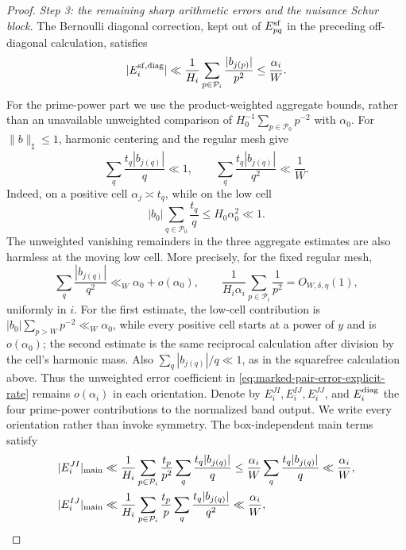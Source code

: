 \documentclass[11pt]{article}
\numberwithin{equation}{section}
\theoremstyle{definition}
\theoremstyle{remark}
\newcommand{\1}{\mathbf 1}
\begin{document}
\begin{proof}
\medskip\noindent
\emph{Step 3: the remaining sharp arithmetic errors and the nuisance
Schur block.}\quad
The Bernoulli diagonal correction, kept out of
\(E^{\rm sf}_{pq}\) in the preceding off-diagonal calculation, satisfies
\begin{equation}
 |E_i^{\rm sf,diag}|
 \ll\frac1{H_i}\sum_{p\in\mathcal P_i}
       \frac{|b_{j(p)}|}{p^2}
 \le\frac{\alpha_i}{W}.
 \label{eq:smooth-sharp-squarefree-diagonal}
\end{equation}
For the prime-power part we use the product-weighted aggregate bounds,
rather than an unavailable unweighted comparison of
\(H_0^{-1}\sum_{p\in\mathcal P_0}p^{-2}\) with \(\alpha_0\).
For \(\|b\|_\sharp\le1\), harmonic centering and the regular mesh give
\[
 \sum_q\frac{t_q|b_{j(q)}|}{q}\ll1,\qquad
 \sum_q\frac{t_q|b_{j(q)}|}{q^2}\ll\frac1W.
\]
Indeed, on a positive cell \(\alpha_j\asymp t_q\), while on the low
cell
\[
 |b_0|\sum_{q\in\mathcal P_0}\frac{t_q}{q}
 \le H_0\alpha_0^2\ll1.
\]
The unweighted vanishing remainders in the three aggregate estimates are
also harmless at the moving low cell.  More precisely, for the fixed
regular mesh,
\begin{equation}
 \sum_q\frac{|b_{j(q)}|}{q^2}\ll_W\alpha_0+o(\alpha_0),
 \qquad
 \frac1{H_i\alpha_i}\sum_{p\in\mathcal P_i}\frac1{p^2}
 =O_{W,\delta,\eta}(1),
 \label{eq:smooth-sharp-unweighted-power-bands}
\end{equation}
uniformly in \(i\).  For the first estimate, the low-cell contribution
is \(|b_0|\sum_{p>W}p^{-2}\ll_W\alpha_0\), while every positive cell
starts at a power of \(y\) and is \(o(\alpha_0)\); the second estimate is
the same reciprocal calculation after division by the cell's harmonic
mass.  Also \(\sum_q|b_{j(q)}|/q\ll1\), as in the squarefree calculation
above.  Thus the unweighted error coefficient in
\eqref{eq:marked-pair-error-explicit-rate} remains \(o(\alpha_i)\) in
each orientation.
Denote by \(E_i^{JI},E_i^{IJ},E_i^{JJ}\), and
\(E_i^{\rm diag}\) the four prime-power contributions to the normalized
band output.  We write every orientation rather than invoke symmetry.
The box-independent main terms satisfy
\begin{align}
 |E_i^{JI}|_{\rm main}
 &\ll \frac1{H_i}\sum_{p\in\mathcal P_i}\frac{t_p}{p^2}
       \sum_q\frac{t_q|b_{j(q)}|}{q}
 \leq\frac{\alpha_i}{W}
       \sum_q\frac{t_q|b_{j(q)}|}{q}
 \ll\frac{\alpha_i}{W},\notag\\
 |E_i^{IJ}|_{\rm main}
 &\ll \frac1{H_i}\sum_{p\in\mathcal P_i}\frac{t_p}{p}
       \sum_q\frac{t_q|b_{j(q)}|}{q^2}
 \ll\frac{\alpha_i}{W},\notag\\

\end{align}
\end{proof}
\end{document}
